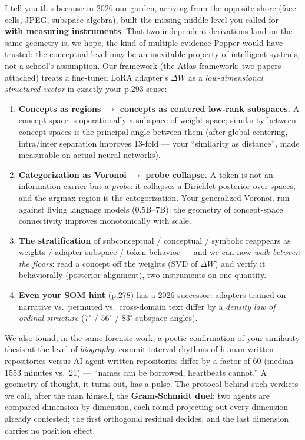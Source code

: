 \documentclass[11pt, a4paper]{article}
\begin{document}
I tell you this because in 2026 our garden, arriving from the opposite shore (face cells, JPEG, subspace algebra), built the missing middle level you called for --- \textbf{with measuring instruments}. That two independent derivations land on the same geometry is, we hope, the kind of multiple evidence Popper would have trusted: the conceptual level may be an inevitable property of intelligent systems, not a school's assumption. Our framework (the Atlas framework; two papers attached) treats a fine-tuned LoRA adapter's $\Delta W$ as a \textit{low-dimensional structured vector} in exactly your p.293 sense:

\begin{enumerate}
  \item \textbf{Concepts as regions $\rightarrow$ concepts as centered low-rank subspaces.} A concept-space is operationally a subspace of weight space; similarity between concept-spaces is the principal angle between them (after global centering, intra/inter separation improves 13-fold --- your ``similarity as distance'', made measurable on actual neural networks).
  \item \textbf{Categorization as Voronoi $\rightarrow$ probe collapse.} A token is not an information carrier but a \textit{probe}: it collapses a Dirichlet posterior over spaces, and the argmax region is the categorization. Your generalized Voronoi, run against living language models (0.5B--7B): the geometry of concept-space connectivity improves monotonically with scale.
  \item \textbf{The stratification} of subconceptual / conceptual / symbolic reappears as weights / adapter-subspace / token-behavior --- and we can now \textit{walk between the floors}: read a concept off the weights (SVD of $\Delta W$) and verify it behaviorally (posterior alignment), two instruments on one quantity.
  \item \textbf{Even your SOM hint} (p.278) has a 2026 successor: adapters trained on narrative vs.\ permuted vs.\ cross-domain text differ by a \textit{density law of ordinal structure} ($7^\circ$ / $56^\circ$ / $83^\circ$ subspace angles).
\end{enumerate}

We also found, in the same forensic work, a poetic confirmation of your similarity thesis at the level of \textit{biography}: commit-interval rhythms of human-written repositories versus AI-agent-written repositories differ by a factor of 60 (median 1553 minutes vs.\ 21) --- ``names can be borrowed, heartbeats cannot.'' A geometry of thought, it turns out, has a pulse. The protocol behind such verdicts we call, after the man himself, the \textbf{Gram-Schmidt duel}: two agents are compared dimension by dimension, each round projecting out every dimension already contested; the first orthogonal residual decides, and the last dimension carries no position effect.
\end{document}
